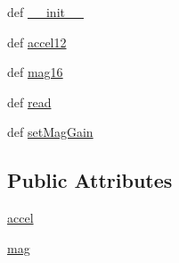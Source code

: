 \begin{DoxyCompactItemize}
\item 
def \hyperlink{classdriver_1_1DRIVER__CORE_1_1Adafruit__LSM303_ae5cf180d90f8866edaab4807bbe8f7bc}{\+\_\+\+\_\+init\+\_\+\+\_\+}
\item 
def \hyperlink{classdriver_1_1DRIVER__CORE_1_1Adafruit__LSM303_a73f30f042346b5134d46ac40ea05287c}{accel12}
\item 
def \hyperlink{classdriver_1_1DRIVER__CORE_1_1Adafruit__LSM303_a14da193d80d260f4d95a2636067685ce}{mag16}
\item 
def \hyperlink{classdriver_1_1DRIVER__CORE_1_1Adafruit__LSM303_a120ac3815a90e0b4ff49ae60958d568c}{read}
\item 
def \hyperlink{classdriver_1_1DRIVER__CORE_1_1Adafruit__LSM303_a91452cc4c7ef0ab07e886843e1cc90dd}{set\+Mag\+Gain}
\end{DoxyCompactItemize}
\subsection*{Public Attributes}
\begin{DoxyCompactItemize}
\item 
\hyperlink{classdriver_1_1DRIVER__CORE_1_1Adafruit__LSM303_a17adc9c743af3a5829980b8a702c64d1}{accel}
\item 
\hyperlink{classdriver_1_1DRIVER__CORE_1_1Adafruit__LSM303_a2afbe1cbd59ce00af91d9e431eb2b391}{mag}
\end{DoxyCompactItemize}
